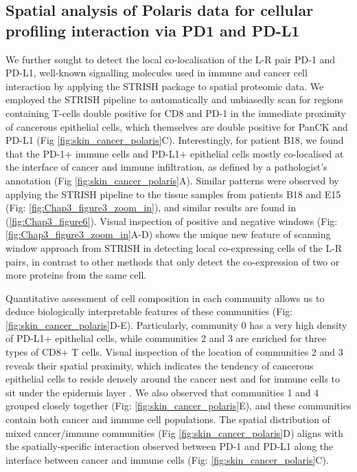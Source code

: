 \subsection{Spatial analysis of Polaris data for cellular profiling interaction via PD1 and PD-L1}
We further sought to detect the local co-localisation of the L-R pair PD-1 and PD-L1, well-known signalling molecules used in immune and cancer cell interaction \cite{pardoll2012blockade} by applying the STRISH package to spatial proteomic data.  We employed the STRISH pipeline to automatically and unbiasedly scan for regions containing T-cells double positive for CD8 and PD-1 in the immediate proximity of cancerous epithelial cells, which themselves are double positive for PanCK and PD-L1 (Fig \ref{fig:skin_cancer_polaris}C). Interestingly, for patient B18, we found that the PD-1+ immune cells and PD-L1+ epithelial cells mostly co-localised at the interface of cancer and immune infiltration, as defined by a pathologist’s annotation (Fig \ref{fig:skin_cancer_polaris}A). Similar patterns were observed by applying the STRISH pipeline to the tissue samples from patients B18 and E15 (Fig: \ref{fig:Chap3_figure3_zoom_in}), and similar results are found in (\ref{fig:Chap3_figure6}). Visual inspection of positive and negative windows (Fig: \ref{fig:Chap3_figure3_zoom_in}A-D) shows the unique new feature of scanning window approach from STRISH in detecting local co-expressing cells of the L-R pairs, in contrast to other methods that only detect the co-expression of two or more proteins from the same cell. 

Quantitative assessment of cell composition in each community allows us to deduce biologically interpretable features of these communities (Fig: \ref{fig:skin_cancer_polaris}D-E). Particularly, community 0 has a very high density of PD-L1+ epithelial cells, while communities 2 and 3 are enriched for three types of CD8+ T cells. Visual inspection of the location of communities 2 and 3 reveals their spatial proximity, which indicates the tendency of cancerous epithelial cells to reside densely around the cancer nest and for immune cells to sit under the epidermis layer \cite{herrscher2020immune}. We also observed that communities 1 and 4 grouped closely together (Fig: \ref{fig:skin_cancer_polaris}E), and these communities contain both cancer and immune cell populations. The spatial distribution of mixed cancer/immune communities (Fig \ref{fig:skin_cancer_polaris}D) aligns with the spatially-specific interaction observed between PD-1 and PD-L1 along the interface between cancer and immune cells (Fig: \ref{fig:skin_cancer_polaris}C).

